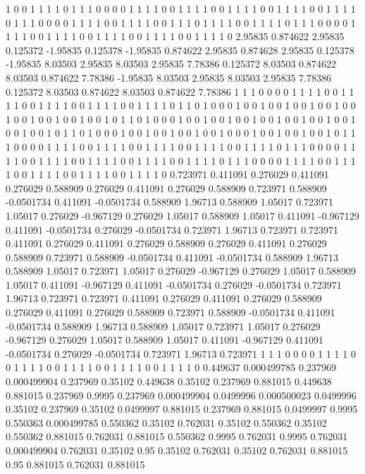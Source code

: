1 0
0 1
1 1
1 0
1 1
1 0
0 0
0 1
1 1
1 0
0 1
1 1
1 0
0 1
1 1
1 0
0 1
1 1
1 0
0 1
1 1
1 0
1 1
1 0
0 0
0 1
1 1
1 0
0 1
1 1
1 0
0 1
1 1
0 1
1 1
1 0
0 1
1 1
1 0
1 1
1 0
0 0
0 1
1 1
1 0
0 1
1 1
1 0
0 1
1 1
1 0
0 1
1 1
1 0
0 1
1 1
1 0
2.95835 0.874622
2.95835 0.125372
-1.95835 0.125378
-1.95835 0.874622
2.95835 0.874628
2.95835 0.125378
-1.95835 8.03503
2.95835 8.03503
2.95835 7.78386
0.125372 8.03503
0.874622 8.03503
0.874622 7.78386
-1.95835 8.03503
2.95835 8.03503
2.95835 7.78386
0.125372 8.03503
0.874622 8.03503
0.874622 7.78386
1 1
1 0
0 0
0 1
1 1
1 0
0 1
1 1
1 0
0 1
1 1
1 0
0 1
1 1
1 0
0 1
1 1
1 0
1 1
0 1
0 0
0 1
0 0
1 0
0 1
0 0
1 0
0 1
0 0
1 0
0 1
0 0
1 0
0 1
0 0
1 0
1 1
0 1
0 0
0 1
0 0
1 0
0 1
0 0
1 0
0 1
0 0
1 0
0 1
0 0
1 0
0 1
0 0
1 0
1 1
0 1
0 0
0 1
0 0
1 0
0 1
0 0
1 0
0 1
0 0
0 1
0 0
1 0
0 1
0 0
1 0
1 1
1 0
0 0
0 1
1 1
1 0
0 1
1 1
1 0
0 1
1 1
1 0
0 1
1 1
1 0
0 1
1 1
1 0
1 1
1 0
0 0
0 1
1 1
1 0
0 1
1 1
1 0
0 1
1 1
1 0
0 1
1 1
1 0
0 1
1 1
1 0
1 1
1 0
0 0
0 1
1 1
1 0
0 1
1 1
1 0
0 1
1 1
1 0
0 1
1 1
1 0
0 1
1 1
1 0
0.723971 0.411091
0.276029 0.411091
0.276029 0.588909
0.276029 0.411091
0.276029 0.588909
0.723971 0.588909
-0.0501734 0.411091
-0.0501734 0.588909
1.96713 0.588909
1.05017 0.723971
1.05017 0.276029
-0.967129 0.276029
1.05017 0.588909
1.05017 0.411091
-0.967129 0.411091
-0.0501734 0.276029
-0.0501734 0.723971
1.96713 0.723971
0.723971 0.411091
0.276029 0.411091
0.276029 0.588909
0.276029 0.411091
0.276029 0.588909
0.723971 0.588909
-0.0501734 0.411091
-0.0501734 0.588909
1.96713 0.588909
1.05017 0.723971
1.05017 0.276029
-0.967129 0.276029
1.05017 0.588909
1.05017 0.411091
-0.967129 0.411091
-0.0501734 0.276029
-0.0501734 0.723971
1.96713 0.723971
0.723971 0.411091
0.276029 0.411091
0.276029 0.588909
0.276029 0.411091
0.276029 0.588909
0.723971 0.588909
-0.0501734 0.411091
-0.0501734 0.588909
1.96713 0.588909
1.05017 0.723971
1.05017 0.276029
-0.967129 0.276029
1.05017 0.588909
1.05017 0.411091
-0.967129 0.411091
-0.0501734 0.276029
-0.0501734 0.723971
1.96713 0.723971
1 1
1 0
0 0
0 1
1 1
1 0
0 1
1 1
1 0
0 1
1 1
1 0
0 1
1 1
1 0
0 1
1 1
1 0
0.449637 0.000499785
0.237969 0.000499904
0.237969 0.35102
0.449638 0.35102
0.237969 0.881015
0.449638 0.881015
0.237969 0.9995
0.237969 0.000499904
0.0499996 0.000500023
0.0499996 0.35102
0.237969 0.35102
0.0499997 0.881015
0.237969 0.881015
0.0499997 0.9995
0.550363 0.000499785
0.550362 0.35102
0.762031 0.35102
0.550362 0.35102
0.550362 0.881015
0.762031 0.881015
0.550362 0.9995
0.762031 0.9995
0.762031 0.000499904
0.762031 0.35102
0.95 0.35102
0.762031 0.35102
0.762031 0.881015
0.95 0.881015
0.762031 0.881015
